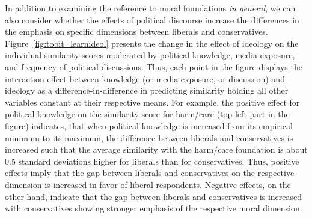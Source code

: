 \documentclass[12pt]{article}
\begin{document}
In addition to examining the reference to moral foundations \textit{in general}, we can also consider whether the effects of political discourse increase the differences in the emphasis on specific dimensions between liberals and conservatives. Figure~\ref{fig:tobit_learnideol} presents the change in the effect of ideology on the individual similarity scores moderated by political knowledge, media exposure, and frequency of political discussions. Thus, each point in the figure displays the interaction effect between knowledge (or media exposure, or discussion) and ideology as a difference-in-difference in predicting similarity holding all other variables constant at their respective means. For example, the positive effect for political knowledge on the similarity score for harm/care (top left part in the figure) indicates, that when political knowledge is increased from its empirical minimum to its maximum, the difference between liberals and conservatives is increased such that the average similarity with the harm/care foundation is about 0.5 standard deviations higher for liberals than for conservatives. Thus, positive effects imply that the gap between liberals and conservatives on the respective dimension is increased in favor of liberal respondents. Negative effects, on the other hand, indicate that the gap between liberals and conservatives is increased with conservatives showing stronger emphasis of the respective moral dimension.
\end{document}
